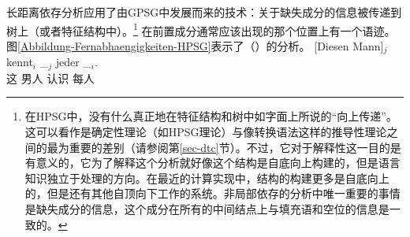 长距离依存分析应用了由GPSG中发展而来的技术：关于缺失成分的信息被传递到树上（或者特征结构中）。\footnote{%
在HPSG中，没有什么真正地在特征结构和树中如字面上所说的“向上传递”。这可以看作是确定性理论（如HPSG理论）与像转换语法这样的推导性理论之间的最为重要的差别（请参阅第\ref{sec-dtc}节）。不过，它对于解释性这一目的是有意义的，它为了解释这个分析就好像这个结构是自底向上构建的，但是语言知识独立于处理的方向。在最近的计算实现中，结构的构建更多是自底向上的，但是还有其他自顶向下工作的系统。非局部依存的分析中唯一重要的事情是缺失成分的信息，这个成分在所有的中间结点上与填充语和空位的信息是一致的。
}
在前置成分通常应该出现的那个位置上有一个语迹。图\ref{Abbildung-Fernabhaengigkeiten-HPSG}表示了（）的分析。
\ea
\label{Beispiel-Diesen-Mann-kent-jeder-HPSG}
\gll {}[Diesen Mann]$_j$ kennt$_i$ \_$_j$ jeder \_$_i$.\\
	 {}\spacebr{}这 男人 认识 {} 每人\\
\z
